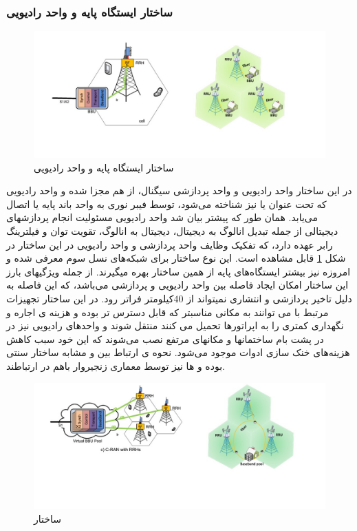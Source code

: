 \subsubsection{ ساختار ایستگاه پایه و واحد رادیویی}
\begin{figure}
  \centering
    \includegraphics[scale=0.7]{./fig/c22}
  \caption{ ساختار ایستگاه پایه و واحد رادیویی \cite{checko2015cloud}}
  \label{fig:c22}
\end{figure}
در این ساختار واحد رادیویی و واحد پردازشی سیگنال، از هم
مجزا شده و واحد رادیویی که تحت عنوان  یا 
نیز شناخته می‌شود، توسط فیبر نوری به واحد باند پایه یا  اتصال می‌یابد. همان طور که پیشتر بیان شد واحد رادیویی مسئولیت
انجام پردازشهای دیجیتالی از جمله تبدیل انالوگ به
دیجیتال، دیجیتال به انالوگ، تقویت توان و فیلترینگ رابر عهده دارد، که تفکیک وظایف واحد پردازشی و واحد
رادیویی در این ساختار در شکل \ref{fig:c22} قابل مشاهده است. این
نوع ساختار برای شبکه‌های نسل سوم معرفی شده و امروزه
نیز بیشتر ایستگاه‌های پایه از همین ساختار بهره میگیرند.
از جمله ویژگیهای بارز این ساختار امکان ایجاد فاصله
بین واحد رادیویی و پردازشی می‌باشد، که این فاصله به
دلیل تاخیر پردازشی و انتشاری نمیتواند از  $40$کیلومتر
فراتر رود. در این ساختار تجهیزات مرتبط با  می
توانند به مکانی مناسبتر که قابل دسترس تر بوده و هزینه
ی اجاره و نگهداری کمتری را به اپراتورها تحمیل می
کنند منتقل شوند و واحدهای رادیویی نیز در در پشت بام
ساختمانها و مکانهای مرتفع نصب می‌شوند که این
خود سبب کاهش هزینه‌های خنک سازی ادوات موجود
می‌شود. نحوه ی ارتباط بین  و  مشابه ساختار
سنتی بوده و ها نیز توسط معماری زنجیروار باهم
در ارتباطند.
\begin{figure}
  \centering
    \includegraphics[scale=0.7]{./fig/c33}
  \caption{ساختار   \cite{checko2015cloud}}
  \label{fig:c33}
\end{figure}
